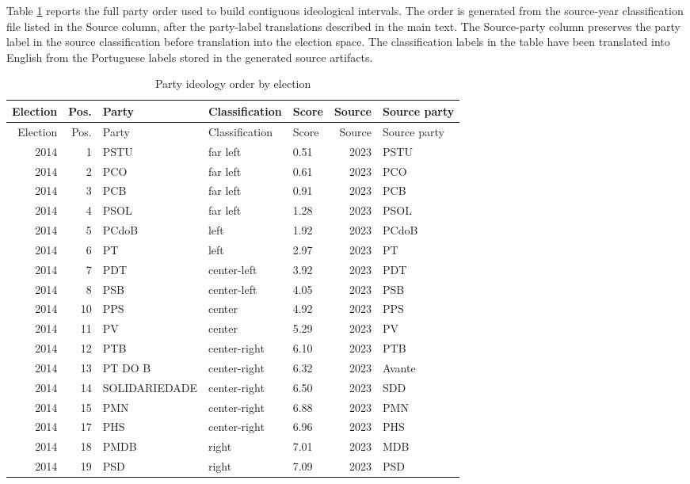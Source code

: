 \documentclass[11pt]{article}
\begin{document}
Table \ref{tab:ideology-order-full} reports the full party order used to build
contiguous ideological intervals. The order is generated from the source-year
classification file listed in the Source column, after the party-label
translations described in the main text. The Source-party column preserves the
party label in the source classification before translation into the election
space. The classification labels in the table have been translated into English
from the Portuguese labels stored in the generated source artifacts.

\begin{longtable}{rrlllrl}
\caption{Party ideology order by election}\label{tab:ideology-order-full}\\
\toprule
Election & Pos. & Party & Classification & Score & Source & Source party \\
\midrule
\endfirsthead
\toprule
Election & Pos. & Party & Classification & Score & Source & Source party \\
\midrule
\endhead
2014 & 1 & PSTU & far left & 0.51 & 2023 & PSTU \\
2014 & 2 & PCO & far left & 0.61 & 2023 & PCO \\
2014 & 3 & PCB & far left & 0.91 & 2023 & PCB \\
2014 & 4 & PSOL & far left & 1.28 & 2023 & PSOL \\
2014 & 5 & PCdoB & left & 1.92 & 2023 & PCdoB \\
2014 & 6 & PT & left & 2.97 & 2023 & PT \\
2014 & 7 & PDT & center-left & 3.92 & 2023 & PDT \\
2014 & 8 & PSB & center-left & 4.05 & 2023 & PSB \\
2014 & 10 & PPS & center & 4.92 & 2023 & PPS \\
2014 & 11 & PV & center & 5.29 & 2023 & PV \\
2014 & 12 & PTB & center-right & 6.10 & 2023 & PTB \\
2014 & 13 & PT DO B & center-right & 6.32 & 2023 & Avante \\
2014 & 14 & SOLIDARIEDADE & center-right & 6.50 & 2023 & SDD \\
2014 & 15 & PMN & center-right & 6.88 & 2023 & PMN \\
2014 & 17 & PHS & center-right & 6.96 & 2023 & PHS \\
2014 & 18 & PMDB & right & 7.01 & 2023 & MDB \\
2014 & 19 & PSD & right & 7.09 & 2023 & PSD \\

\end{longtable}
\end{document}

